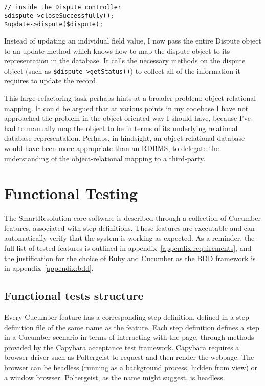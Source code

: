\begin{lstlisting}
// inside the Dispute controller
$dispute->closeSuccessfully();
$update->dispute($dispute);
\end{lstlisting}

Instead of updating an individual field value, I now pass the entire Dispute object to an update method which knows how to map the dispute object to its representation in the database. It calls the necessary methods on the dispute object (such as \lstinline{$dispute->getStatus()}) to collect all of the information it requires to update the record.

This large refactoring task perhaps hints at a broader problem: object-relational mapping. It could be argued that at various points in my codebase I have not approached the problem in the object-oriented way I should have, because I've had to manually map the object to be in terms of its underlying relational database representation. Perhaps, in hindsight, an object-relational database would have been more appropriate than an RDBMS, to delegate the understanding of the object-relational mapping to a third-party.

\section{Functional Testing}

The SmartResolution core software is described through a collection of Cucumber features, associated with step definitions. These features are executable and can automatically verify that the system is working as expected. As a reminder, the full list of tested features is outlined in appendix~\ref{appendix:requirements}, and the justification for the choice of Ruby and Cucumber as the BDD framework is in appendix~\ref{appendix:bdd}.

\subsection{Functional tests structure}

Every Cucumber feature has a corresponding step definition, defined in a step definition file of the same name as the feature. Each step definition defines a step in a Cucumber scenario in terms of interacting with the page, through methods provided by the Capybara acceptance test framework. Capybara requires a browser driver such as Poltergeist to request and then render the webpage. The browser can be headless (running as a background process, hidden from view) or a window browser. Poltergeist, as the name might suggest, is headless.

